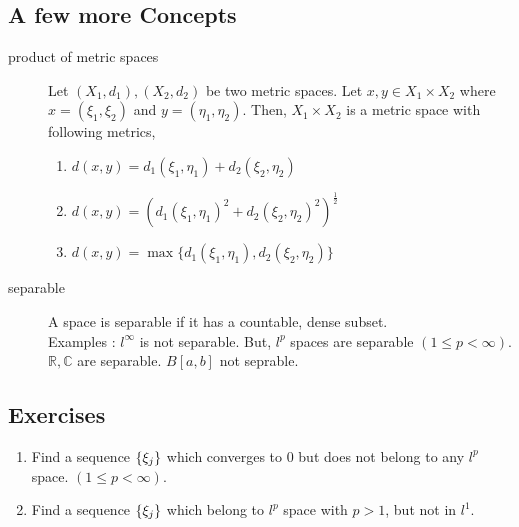 \subsection{A few more Concepts}
\begin{description}
	\item[product of metric spaces]
		Let $(X_1,d_1),(X_2,d_2)$ be two metric spaces.
		Let $x,y \in X_1 \times X_2$ where $x = (\xi_1,\xi_2 )$ and $y = (\eta_1,\eta_2)$.
		Then, $X_1 \times X_2$ is a metric space with following metrics,
		\begin{enumerate}
			\item $\displaystyle d(x,y) = d_1\left(\xi_1,\eta_1\right) + d_2\left(\xi_2,\eta_2\right)$
			\item $\displaystyle d(x,y) = \left( d_1\left( \xi_1,\eta_1 \right)^2 + d_2\left(\xi_2,\eta_2\right)^2 \right)^\frac{1}{2}$
			\item $\displaystyle d(x,y) = \max \{ d_1 \left(\xi_1,\eta_1\right) , d_2\left(\xi_2,\eta_2\right) \}$
		\end{enumerate}
	\item[separable] A space is separable if it has a countable, dense subset.\\
		Examples : $l^\infty$ is not separable. But, $l^p$ spaces are separable $(1 \le p <\infty)$. $\mathbb{R},\mathbb{C}$ are separable. $B[a,b]$ not seprable.
\end{description}
\subsection{Exercises}
\begin{enumerate}
	\item Find a sequence $\left\{\xi_j\right\}$ which converges to $0$ but does not belong to any $l^p$ space. $(1 \le p < \infty)$.
	\item Find a sequence $\left\{\xi_j\right\}$ which belong to $l^p$ space with $p>1$, but not in $l^1$.
\end{enumerate}
\setcounter{subsection}{4}
